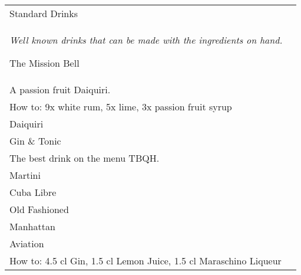 \documentclass[12pt]{article}
\makeatletter
\newcommand*\ColText[1]{\textcolor{Goldenrod3}{#1}}
\newenvironment{Group}[1]
  {\noindent\begin{tabular*}{\textwidth}{@{}p{.8\linewidth}@{\extracolsep{\fill}}r@{}}
    {\fontsize{24}{29}\selectfont\ColText{#1}}\\[0.8em]}
  {\end{tabular*}}
\newcommand*\Entry[1]{%
  \sffamily#1 \\
}
\newcommand*\Expl[1]{
  \hspace*{1em}\footnotesize #1 \\
}
\newcommand*\HowTo[1]{
  \hspace*{1em}\footnotesize How to: \hspace*{1em}#1 \\
}
\makeatother
\begin{document}
\vfill

\begin{Group}{Standard Drinks}
\emph{Well known drinks that can be made with the ingredients on hand.}

\Entry{The Mission Bell}
\Expl{A passion fruit Daiquiri.}
\HowTo{9x white rum, 5x lime, 3x passion fruit syrup}

\Entry{Daiquiri}
\Entry{Gin \& Tonic}
\Expl{The best drink on the menu TBQH.}
\Entry{Martini}
\Entry{Cuba Libre}
\Entry{Old Fashioned}
\Entry{Manhattan}

\Entry{Aviation}
\HowTo{4.5 cl Gin, 1.5 cl Lemon Juice, 1.5 cl Maraschino Liqueur}

\end{Group}
\end{document}

